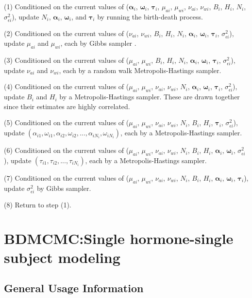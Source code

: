 \documentclass[11pt]{book}
\begin{document}
\noindent (1) Conditioned on the current values of ($\boldsymbol{\alpha}_i$, $\boldsymbol{\omega}_i$, $\boldsymbol{\tau}_i$, $\mu_{ai}$, $\mu_{wi}$, $\nu_{ai}$, $\nu_{wi}$, $B_i$, $H_i$, $N_i$, $\sigma_{\epsilon i}^2$), update $N_i$, $\boldsymbol{\alpha}_i$, $\boldsymbol{\omega}_i$, and $\boldsymbol{\tau}_i$ by running the birth-death process.

\noindent (2) Conditioned on the current values of ($\nu_{ai}$, $\nu_{wi}$, $B_i$, $H_i$, $N_i$, $\boldsymbol{\alpha}_i$, $\boldsymbol{\omega}_i$, $\boldsymbol{\tau}_i$, $\sigma_{\epsilon i}^2$), update $\mu_{ai}$ and $\mu_{wi}$, each by Gibbs sampler \cite{Geman}.

\noindent (3) Conditioned on the current values of ($\mu_{ai}$, $\mu_{wi}$, $B_i$, $H_i$, $N_i$, $\boldsymbol{\alpha}_i$, $\boldsymbol{\omega}_i$, $\boldsymbol{\tau}_i$, $\sigma_{\epsilon i}^2$), update $\nu_{ai}$ and $\nu_{wi}$, each by a random walk Metropolis-Hastings sampler.

\noindent (4) Conditioned on the current values of ($\mu_{ai}$, $\mu_{wi}$, $\nu_{ai}$, $\nu_{wi}$, $N_i$, $\boldsymbol{\alpha}_i$, $\boldsymbol{\omega}_i$, $\boldsymbol{\tau}_i$, $\sigma_{\epsilon i}^2$), update $B_i$ and $H_i$ by a Metropolis-Hastings sampler. These are drawn together since their estimates are highly correlated.

\noindent (5) Conditioned on the current values of ($\mu_{ai}$, $\mu_{wi}$, $\nu_{ai}$, $\nu_{wi}$, $N_i$, $B_i$, $H_i$, $\boldsymbol{\tau}_i$, $\sigma_{\epsilon i}^2$), update $(\alpha_{i1}, \omega_{i1}, \alpha_{i2}, \omega_{i2}, ... ,\alpha_{iN_i}, \omega_{iN_i})$, each by a Metropolis-Hastings sampler.

\noindent (6) Conditioned on the current values of ($\mu_{ai}$, $\mu_{wi}$, $\nu_{ai}$, $\nu_{wi}$, $N_i$, $B_i$, $H_i$, $\boldsymbol{\alpha}_i$, $\boldsymbol{\omega}_i$, $\sigma_{\epsilon i}^2$), update $(\tau_{i1},\tau_{i2},...,\tau_{iN_i})$, each by a Metropolis-Hastings sampler.

\noindent (7) Conditioned on the current values of ($\mu_{ai}$, $\mu_{wi}$, $\nu_{ai}$, $\nu_{wi}$, $N_i$, $B_i$, $H_i$, $\boldsymbol{\alpha}_i$, $\boldsymbol{\omega}_i$, $\boldsymbol{\tau}_i$), update $\sigma_{\epsilon i}^2$ by Gibbs sampler.

\noindent (8) Return to step (1).
\chapter{BDMCMC:Single hormone-single subject modeling}
\section{General Usage Information}
\end{document}
